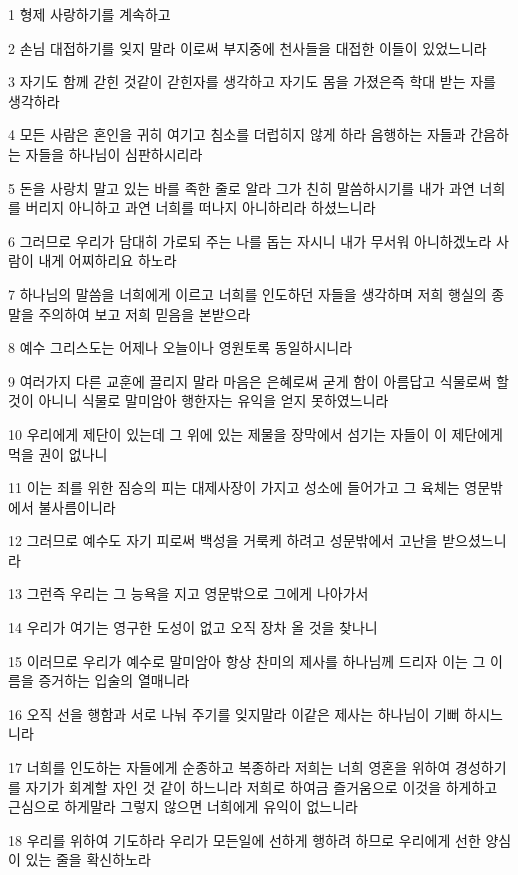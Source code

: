 \par 1 형제 사랑하기를 계속하고
\par 2 손님 대접하기를 잊지 말라 이로써 부지중에 천사들을 대접한 이들이 있었느니라
\par 3 자기도 함께 갇힌 것같이 갇힌자를 생각하고 자기도 몸을 가졌은즉 학대 받는 자를 생각하라
\par 4 모든 사람은 혼인을 귀히 여기고 침소를 더럽히지 않게 하라 음행하는 자들과 간음하는 자들을 하나님이 심판하시리라
\par 5 돈을 사랑치 말고 있는 바를 족한 줄로 알라 그가 친히 말씀하시기를 내가 과연 너희를 버리지 아니하고 과연 너희를 떠나지 아니하리라 하셨느니라
\par 6 그러므로 우리가 담대히 가로되 주는 나를 돕는 자시니 내가 무서워 아니하겠노라 사람이 내게 어찌하리요 하노라
\par 7 하나님의 말씀을 너희에게 이르고 너희를 인도하던 자들을 생각하며 저희 행실의 종말을 주의하여 보고 저희 믿음을 본받으라
\par 8 예수 그리스도는 어제나 오늘이나 영원토록 동일하시니라
\par 9 여러가지 다른 교훈에 끌리지 말라 마음은 은혜로써 굳게 함이 아름답고 식물로써 할것이 아니니 식물로 말미암아 행한자는 유익을 얻지 못하였느니라
\par 10 우리에게 제단이 있는데 그 위에 있는 제물을 장막에서 섬기는 자들이 이 제단에게 먹을 권이 없나니
\par 11 이는 죄를 위한 짐승의 피는 대제사장이 가지고 성소에 들어가고 그 육체는 영문밖에서 불사름이니라
\par 12 그러므로 예수도 자기 피로써 백성을 거룩케 하려고 성문밖에서 고난을 받으셨느니라
\par 13 그런즉 우리는 그 능욕을 지고 영문밖으로 그에게 나아가서
\par 14 우리가 여기는 영구한 도성이 없고 오직 장차 올 것을 찾나니
\par 15 이러므로 우리가 예수로 말미암아 항상 찬미의 제사를 하나님께 드리자 이는 그 이름을 증거하는 입술의 열매니라
\par 16 오직 선을 행함과 서로 나눠 주기를 잊지말라 이같은 제사는 하나님이 기뻐 하시느니라
\par 17 너희를 인도하는 자들에게 순종하고 복종하라 저희는 너희 영혼을 위하여 경성하기를 자기가 회계할 자인 것 같이 하느니라 저희로 하여금 즐거움으로 이것을 하게하고 근심으로 하게말라 그렇지 않으면 너희에게 유익이 없느니라
\par 18 우리를 위하여 기도하라 우리가 모든일에 선하게 행하려 하므로 우리에게 선한 양심이 있는 줄을 확신하노라
